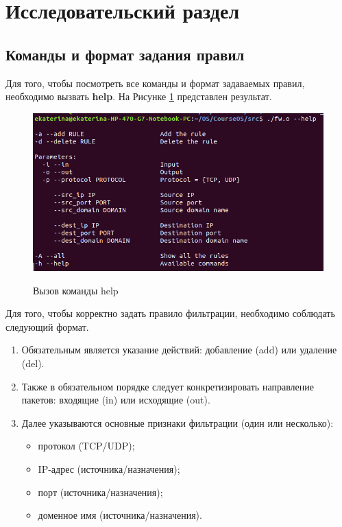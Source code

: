 \section{Исследовательский раздел}

\subsection{Команды и формат задания правил}
Для того, чтобы посмотреть все команды и формат задаваемых правил, необходимо вызвать \textbf{help}. На Рисунке \ref{fig11:image} представлен результат.

\begin{figure}[h]
	\begin{center}
		{\includegraphics[scale = 0.6]{img/screenshots/help/help.png}}
		\caption{Вызов команды help}
		\label{fig11:image}
	\end{center}
\end{figure}
Для того, чтобы корректно задать правило фильтрации, необходимо соблюдать следующий формат.
\begin{enumerate}
	\item Обязательным является указание действий: добавление (add) или удаление (del).
	
	\item Также в обязательном порядке следует конкретизировать направление пакетов: входящие (in) или исходящие (out).
	
	\item Далее указываются основные признаки фильтрации (один или несколько):
	\begin{itemize}
		\item протокол (TCP/UDP);
		
		\item IP-адрес (источника/назначения);
		
		\item порт (источника/назначения);
		
		\item доменное имя (источника/назначения). \newline
	\end{itemize}
	
\end{enumerate}


